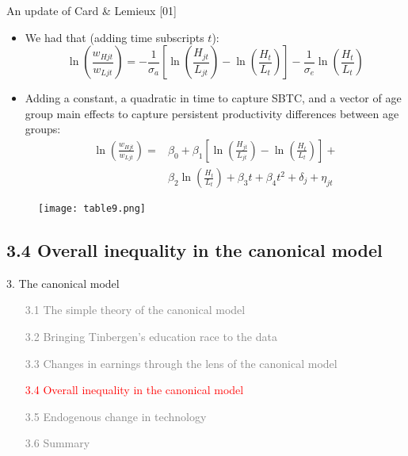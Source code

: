 \documentclass[notes=show]{beamer}
\begin{document}
\begin{frame}{An update of Card \& Lemieux [01]}
\begin{itemize}
\item We had that (adding time subscripts $t$):
\[
\ln(\frac{w_{Hjt}}{w_{Ljt}})= - \frac{1}{\sigma_{a}}[ \ln(\frac{H_{jt}}{L_{jt}})- \ln(\frac{H_{t}}{L_{t}})] - \frac{1}{\sigma_{e}} \ln(\frac{H_{t}}{L_{t}})
\]
\item Adding a constant, a quadratic in time to capture SBTC, and a vector of age group main effects to capture persistent productivity differences between age groups:
\begin{align*}
\ln(\frac{w_{Hjt}}{w_{Ljt}})  = & \beta_{0} + \beta_{1} [ \ln(\frac{H_{jt}}{L_{jt}})- \ln(\frac{H_{t}}{L_{t}})] + \\
& \beta_{2} \ln(\frac{H_{t}}{L_{t}}) + \beta_{3}t + \beta_{4}t^{2} + \delta_{j} + \eta_{jt} 
\end{align*}
\end{itemize}
\end{frame}

\newpage
\begin{center}
\begin{figure}
\texttt{[image: table9.png]}
\end{figure} 
\end{center}
\newpage

\subsection{3.4 Overall inequality in the canonical model}

\begin{frame}{3. The canonical model}
\begin{itemize}
\item[\textcolor{gray}{3.1}] \textcolor{gray}{The simple theory of the canonical model} \medskip
\item[\textcolor{gray}{3.2}] \textcolor{gray}{Bringing Tinbergen's education race to the data} \medskip
\item[\textcolor{gray}{3.3}] \textcolor{gray}{Changes in earnings through the lens of the canonical model} \medskip
\item[\textcolor{red}{3.4}] \textcolor{red}{Overall inequality in the canonical model} \medskip
\item[\textcolor{gray}{3.5}] \textcolor{gray}{Endogenous change in technology} \medskip
\item[\textcolor{gray}{3.6}] \textcolor{gray}{Summary}
\end{itemize}
\end{frame}
\end{document}
